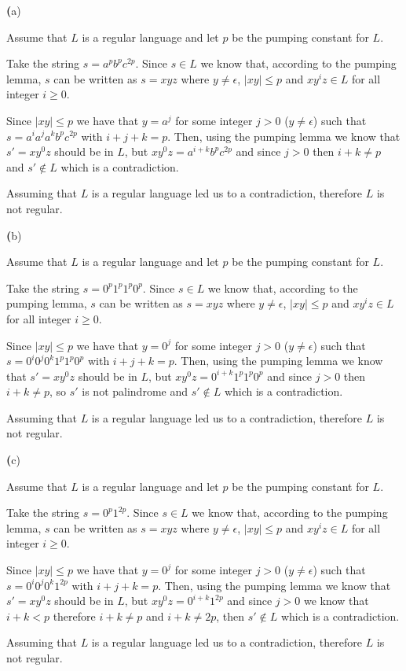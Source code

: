 \documentclass[11pt]{article}
\renewcommand{\part}[1] {{\vspace{0.15in}\noindent\textbf (#1)} \vspace{0.10in}}
\begin{document}
\part{a} 
\par Assume that $L$ is a regular language and let $p$ be the pumping constant for $L$.
\par Take the string $s = a^pb^pc^{2p}$. Since $s \in L$ we know that, according to the pumping lemma, $s$ can be written as $s = xyz$ where $y \neq \epsilon$, $|xy| \leq p$ and $xy^iz \in L$ for all integer $i \geq 0$. 
\par Since $|xy| \leq p$ we have that $y = a^j$ for some integer $j > 0$ ($y \neq \epsilon$) such that $s = a^ia^ja^kb^pc^{2p}$ with $i + j + k = p$. Then, using the pumping lemma we know that $s' = xy^0z$ should be in $L$, but $xy^0z = a^{i + k}b^pc^{2p}$ and since $j > 0$ then $i + k \neq p$  and $s' \notin L$ which is a contradiction.
\par Assuming that $L$ is a regular language led us to a contradiction, therefore $L$ is not regular.

\part{b}
\par Assume that $L$ is a regular language and let $p$ be the pumping constant for $L$.
\par Take the string $s = 0^p1^p1^p0^p$. Since $s \in L$ we know that, according to the pumping lemma, $s$ can be written as $s = xyz$ where $y \neq \epsilon$, $|xy| \leq p$ and $xy^iz \in L$ for all integer $i \geq 0$.
\par Since $|xy| \leq p$ we have that $y = 0^j$ for some integer $j > 0$ ($y \neq \epsilon$) such that $s = 0^i0^j0^k1^p1^p0^p$ with $i + j + k = p$. Then, using the pumping lemma we know that $s' = xy^0z$ should be in $L$, but $xy^0z = 0^{i + k}1^p1^p0^p$ and since $j > 0$ then $i + k \neq p$, so $s'$ is not palindrome and  $s' \notin L$ which is a contradiction.
\par Assuming that $L$ is a regular language led us to a contradiction, therefore $L$ is not regular.

\part{c}
\par Assume that $L$ is a regular language and let $p$ be the pumping constant for $L$.
\par Take the string $s = 0^p1^{2p}$. Since $s \in L$ we know that, according to the pumping lemma, $s$ can be written as $s = xyz$ where $y \neq \epsilon$, $|xy| \leq p$ and $xy^iz \in L$ for all integer $i \geq 0$.
\par Since $|xy| \leq p$ we have that $y = 0^j$ for some integer $j > 0$ ($y \neq \epsilon$) such that $s = 0^i0^j0^k1^{2p}$ with $i + j + k = p$. Then, using the pumping lemma we know that $s' = xy^0z$ should be in $L$, but $xy^0z = 0^{i + k}1^{2p}$ and since $j > 0$ we know that $i + k < p$ therefore $i + k \neq p$ and $i + k \neq 2p$, then $s' \notin L$ which is a contradiction.
\par Assuming that $L$ is a regular language led us to a contradiction, therefore $L$ is not regular.
\end{document}
